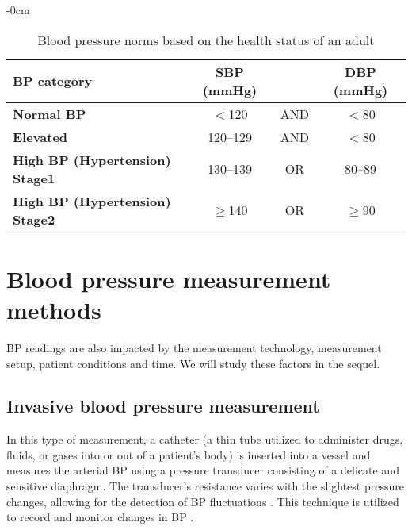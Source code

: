 \documentclass[journal,article,moreauthors]{Definitions/mdpi}
\begin{document}
\begin{table}[tb]
    \begin{adjustwidth}{-\extralength}{0cm}
    \caption{Blood pressure norms based on the health status of an adult \citep{Whelton2018}}\label{Tab: BPcategory}
    \begin{center}
    \begin{tabularx}{\textwidth}{p{5cm}CCC}
        \toprule
        \textbf{BP category} & \textbf{SBP (mmHg)} & 
        &
        \textbf{DBP (mmHg)} \\
        \midrule
        \textbf{Normal BP} & $<$120 & {AND} & $<$80 \\
        \hline
        \textbf{Elevated} & 120--129 & {AND} & $<$80 \\
        \hline
        \textbf{High BP (Hypertension) Stage1} & 130--139 & {OR} & 80--89 \\
        \hline
        \textbf{High BP (Hypertension) Stage2} & $\geq$140 & {OR} & $\geq$90 \\
        \bottomrule
    \end{tabularx}
    \end{center}
    \end{adjustwidth}
\end{table}

\section{Blood pressure measurement methods}\label{sec: BP_techs}
BP readings are also impacted by the measurement technology, measurement setup, patient conditions and time. We will study these factors in the sequel.

\subsection{Invasive blood pressure measurement}
\label{sec:invasive_BP_measurement}
In this type of measurement, a catheter (a thin tube utilized to administer drugs, fluids, or gases into or out of a patient's body) is inserted into a vessel and measures the arterial BP using a pressure transducer consisting of a delicate and sensitive diaphragm. The transducer's resistance varies with the slightest pressure changes, allowing for the detection of BP fluctuations \citep{ding2016continuous}. This technique is utilized to record and monitor changes in BP \citep{Cole2007-rx}.
\end{document}
